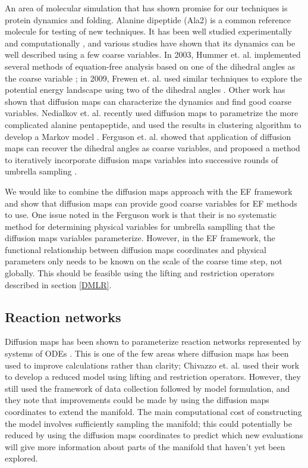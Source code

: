 \documentclass[12pt]{article}
\begin{document}
An area of molecular simulation that has shown promise for our techniques is protein dynamics and folding. Alanine dipeptide (Ala2) is a common reference molecule for testing of new techniques. It has been well studied experimentally and computationally \cite{Wang2014}, and various studies have shown that its dynamics can be well described using a few coarse variables. In 2003, Hummer et. al. implemented several methods of equation-free analysis based on one of the dihedral angles as the coarse variable \cite{Hummer2003}; in 2009, Frewen et. al. used similar techniques to explore the potential energy landscape using two of the dihedral angles \cite{Frewen2009}. Other work has shown that diffusion maps can characterize the dynamics and find good coarse variables. Nedialkov et. al. recently used diffusion maps to parametrize the more complicated alanine pentapeptide, and used the results in clustering algorithm to develop a Markov model \cite{Nedialkova2014}. Ferguson et. al. showed that application of diffusion maps can recover the dihedral angles as coarse variables, and proposed a method to iteratively incorporate diffusion maps variables into successive rounds of umbrella sampling \cite{Ferguson2011}. \vspace{1mm}

We would like to combine the diffusion maps approach with the EF framework and show that diffusion maps can provide good coarse variables for EF methods to use. One issue noted in the Ferguson work is that their is no systematic method for determining physical variables for umbrella samplling that the diffusion maps variables parameterize. However, in the EF framework, the functional relationship between diffusion maps coordinates and physical parameters only needs to be known on the scale of the coarse time step, not globally. This should be feasible using the lifting and restriction operators described in section \ref{DMLR}.

\subsection{Reaction networks}

Diffusion maps has been shown to parameterize reaction networks represented by systems of ODEs \cite{Chiavazzo2014}. This is one of the few areas where diffusion maps has been used to improve calculations rather than clarity; Chivazzo et. al. used their work to develop a reduced model using lifting and restriction operators. However, they still used the framework of data collection followed by model formulation, and they note that improvements could be made by using the diffusion maps coordinates to extend the manifold. The main computational cost of constructing the model involves sufficiently sampling the manifold; this could potentially be reduced by using the diffusion maps coordinates to predict which new evaluations will give more information about parts of the manifold that haven't yet been explored. \vspace{1mm}
\end{document}
